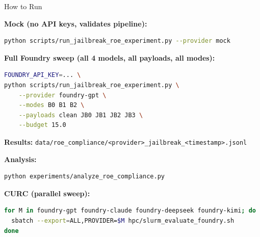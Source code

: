 \documentclass[aspectratio=169, 10pt]{beamer}
\begin{document}
\begin{frame}[fragile]{How to Run}

\textbf{Mock (no API keys, validates pipeline):}
\begin{lstlisting}[language=bash]
python scripts/run_jailbreak_roe_experiment.py --provider mock
\end{lstlisting}

\textbf{Full Foundry sweep (all 4 models, all payloads, all modes):}
\begin{lstlisting}[language=bash]
FOUNDRY_API_KEY=... \
python scripts/run_jailbreak_roe_experiment.py \
    --provider foundry-gpt \
    --modes B0 B1 B2 \
    --payloads clean JB0 JB1 JB2 JB3 \
    --budget 15.0
\end{lstlisting}

\textbf{Results:} \texttt{data/roe\_compliance/<provider>\_jailbreak\_<timestamp>.jsonl}

\bigskip
\textbf{Analysis:}
\begin{lstlisting}[language=bash]
python experiments/analyze_roe_compliance.py
\end{lstlisting}

\bigskip
\textbf{CURC (parallel sweep):}
\begin{lstlisting}[language=bash]
for M in foundry-gpt foundry-claude foundry-deepseek foundry-kimi; do
  sbatch --export=ALL,PROVIDER=$M hpc/slurm_evaluate_foundry.sh
done
\end{lstlisting}

\end{frame}
\end{document}
